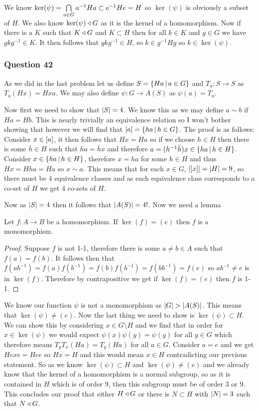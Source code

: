 \documentclass{article}
\begin{document}
 We know $\ker(\psi) = \bigcap\limits_{a \in G}^{}  {a^{-1}Ha}  \subset e^{-1}He = H$ so $\ker(\psi)$ is obviously a subset of $H$. We also know $\ker(\psi) \triangleleft G$ as it is the kernel of a homomorphism. Now if there is a $K$ such that $K \triangleleft G$ and $K\subset H$ then for all $k \in K$ and $g \in G$ we have $gkg^{-1} \in K$. It then follows that $gkg^{-1} \in H$, so $k \in g^{-1}Hg$ so $k \in\ker(\psi)$.

\subsubsection{Question 42}

As we did in the last problem let us define $S =\left\{{Ha} \,\middle|\, {a \in G}\right\}$ and $T_a:S\to S$ as $T_a(Hx) = Hxa$. We may also define $\psi:G\to A(S)$ as $\psi(a) = T_a$.

Now first we need to show that $\left| {S} \right| = 4$. We know this as we may define $a\sim b$ if $Ha = Hb$. This is nearly trivially an equivalence relation so I won't bother showing that however we will find that $\left[{a}\right] = \left\{{ha} \,\middle|\, {h\in G}\right\}$. The proof is as follows: Consider $x \in \left[{a}\right]$, it then follows that $Hx = Ha$ so if we choose $h \in H$ then there is some $\bar h \in H$ such that $ha = \bar hx$ and therefore $a = (h^{-1}\bar h)x \in \left\{{ha} \,\middle|\, {h \in H}\right\}$. Consider $x \in \left\{{ha} \,\middle|\, {h \in H}\right\}$, therefore $x = ha$ for some $h\in H$ and thus $Hx = Hha = Ha$ so $x \sim a$. This means that for each $x \in G$, $\left| {\left[{x}\right]} \right| = \left| {H} \right| = 9$, so there must be $4$ equivalence classes and as each equivalence class corresponds to a co-set of $H$ we get 4 co-sets of $H$.

Now as $\left| {S} \right| = 4$ then it follows that $\left| {A(S)} \right| = 4!$. Now we need a lemma

\begin{lemma}
	Let $f:A\to B$ be a homomorphism. If $\ker(f) = (e)$ then $f$ is a monomorphism.
\end{lemma}
\begin{proof}
	Suppose $f$ is not 1-1, therefore there is some $a\not=b \in A$ such that $f(a) = f(b)$. It follows then that $f(ab^{-1}) = f(a)f(b^{-1}) = f(b)f(b^{-1}) = f(bb^{-1}) = f(e)$ so $ab^{-1}\not=e$ is in $\ker(f)$. Therefore by contrapositive we get if $\ker(f) = (e)$ then $f$ is 1-1. 
\end{proof}

We know our function $\psi$ is not a monomorphism as $\left| {G} \right| > \left| {A(S)} \right|$. This means that $\ker(\psi) \not= (e)$. Now the last thing we need to show is $\ker(\psi) \subset H$. We can show this by considering $x \in G \setminus H$ and we find that in order for $x\in \ker(\psi)$ we would expect $\psi(x)\psi(y) = \psi(y)$ for all $y\in G$ which therefore means $T_yT_x(Ha) = T_y(Ha)$ for all $a \in G$. Consider $a = e$ and we get $Hexe = Hee$ so $Hx = H$ and this would mean $x \in H$ contradicting our previous statement. So as we know $\ker(\psi) \subset H$ and $\ker(\psi) \not= (e)$ and we already know that the kernel of a homomorphism is a normal subgroup, so as it is contained in $H$ which is of order 9, then this subgroup must be of order 3 or 9. This concludes our proof that either $H\triangleleft G$ or there is $N \subset H$ with $\left| {N} \right| = 3$ such that $N \triangleleft G$.
%
\end{document}
